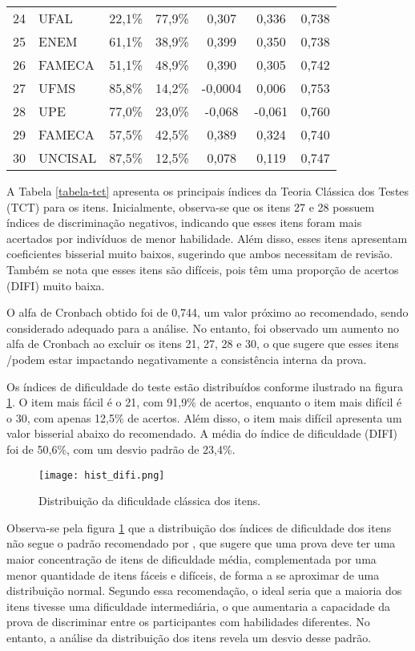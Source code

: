 \begin{table}[H]
{\begin{tabular*}{.8\textwidth}{@{\extracolsep{\fill}}clccccc@{}}
			24 & UFAL & 22,1\% & 77,9\% & 0,307 & 0,336 & 0,738 \\ 
			25 & ENEM & 61,1\% & 38,9\% & 0,399 & 0,350 & 0,738 \\ 
			26 & FAMECA & 51,1\% & 48,9\% & 0,390 & 0,305 & 0,742 \\ 
			27 & UFMS & 85,8\% & 14,2\% & -0,0004 & 0,006 & 0,753 \\ 
			28 & UPE & 77,0\% & 23,0\% & -0,068 & -0,061 & 0,760 \\ 
			29 & FAMECA & 57,5\% & 42,5\% & 0,389 & 0,324 & 0,740 \\ 
			30 & UNCISAL & 87,5\% & 12,5\% & 0,078 & 0,119 & 0,747 \\ 
			\bottomrule
		\end{tabular*}
	}{%
	}
\end{table}


A Tabela \ref{tabela-tct} apresenta os principais índices da Teoria Clássica dos Testes (TCT) para os itens. Inicialmente, observa-se que os itens 27 e 28 possuem índices de discriminação negativos, indicando que esses itens foram mais acertados por indivíduos de menor habilidade. Além disso, esses itens apresentam coeficientes bisserial muito baixos, sugerindo que ambos necessitam de revisão. Também se nota que esses itens são difíceis, pois têm uma proporção de acertos (DIFI) muito baixa.


O alfa de Cronbach obtido foi de 0,744, um valor próximo ao recomendado, sendo considerado adequado para a análise. No entanto, foi observado um aumento no alfa de Cronbach ao excluir os itens 21, 27, 28 e 30, o que sugere que esses itens /podem estar impactando negativamente a consistência interna da prova.


Os índices de dificuldade do teste estão distribuídos conforme ilustrado na figura \ref{fig:hist_difi}. O item mais fácil é o 21, com 91,9\% de acertos, enquanto o item mais difícil é o 30, com apenas 12,5\% de acertos. Além disso, o item mais difícil apresenta um valor bisserial abaixo do recomendado. A média do índice de dificuldade (DIFI) foi de 50,6\%, com um desvio padrão de 23,4\%.

\begin{figure}[H]
	\centering
	\texttt{[image: hist\_difi.png]}
	\caption{Distribuição da dificuldade clássica dos itens.}
	\label{fig:hist_difi}
\end{figure}


Observa-se pela figura \ref{fig:hist_difi} que a distribuição dos índices de dificuldade dos itens não segue o padrão recomendado por , que sugere que uma prova deve ter uma maior concentração de itens de dificuldade média, complementada por uma menor quantidade de itens fáceis e difíceis, de forma a se aproximar de uma distribuição normal. Segundo essa recomendação, o ideal seria que a maioria dos itens tivesse uma dificuldade intermediária, o que aumentaria a capacidade da prova de discriminar entre os participantes com habilidades diferentes. No entanto, a análise da distribuição dos itens revela um desvio desse padrão.

